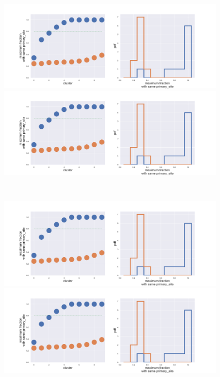\begin{figure}
    \centering
    \begin{minipage}{0.45\textwidth}
    \includegraphics[width=0.9\linewidth]{pictures/topic/gtex/oversigma_10tissue/shuffledcluster_maximum_l3_primary_site.pdf}
    \end{minipage}
    \hspace{3mm}
    \begin{minipage}{0.45\textwidth}
    \includegraphics[width=0.9\linewidth]{pictures/topic/gtex/oversigma_10tissue/shuffledcluster_maximum_l3_primary_site.pdf}
    \end{minipage}
    \\
    \begin{minipage}{0.45\textwidth}
    \includegraphics[width=0.9\linewidth]{pictures/topic/gtex/oversigma_10tissue/shuffledcluster_maximum_l3_primary_site.pdf}
    \end{minipage}
    \hspace{3mm}
    \begin{minipage}{0.45\textwidth}
    \includegraphics[width=0.9\linewidth]{pictures/topic/gtex/oversigma_10tissue/shuffledcluster_maximum_l3_primary_site.pdf}
    \end{minipage}
\end{figure}


